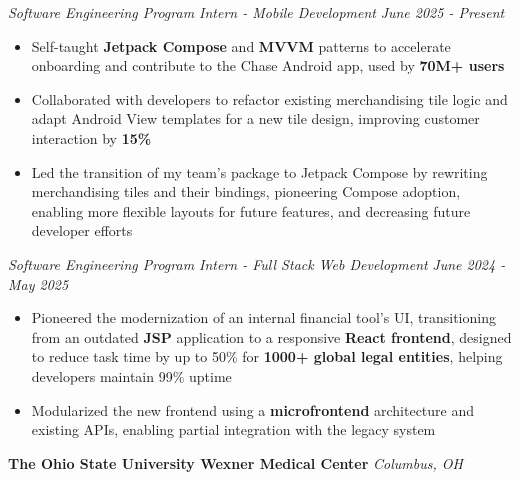 \documentclass[letterpaper]{article}
\newenvironment{tightitemize}{%
  \begin{itemize}\small\setlength{\baselineskip}{0.95\baselineskip}\itemsep -1mm%
}{\end{itemize}}
\begin{document}
    \textit{Software Engineering Program Intern - Mobile Development} \hfill \textsl{June 2025 - Present}\\
    \vspace{-7pt}
    \begin{tightitemize} \itemsep -1mm

            \item Self-taught \textbf{Jetpack Compose} and \textbf{MVVM} patterns to accelerate onboarding and contribute to the Chase Android app, used by \textbf{70M+ users}
            
            \item Collaborated with developers to refactor existing merchandising tile logic and adapt Android View templates for a new tile design, improving customer interaction by \textbf{15\%}
            
            \item Led the transition of my team’s package to Jetpack Compose by rewriting merchandising tiles and their bindings, pioneering Compose adoption, enabling more flexible layouts for future features, and decreasing future developer efforts
                    
    \end{tightitemize}
    \textit{Software Engineering Program Intern - Full Stack Web Development} \hfill \textsl{June 2024 - May 2025}\\
    \vspace{-7pt}
    \begin{tightitemize} \itemsep -1mm

            \item Pioneered the modernization of an internal financial tool’s UI, transitioning from an outdated \textbf{JSP} application to a responsive \textbf{React frontend}, designed to reduce task time by up to 50\% for \textbf{1000+ global legal entities}, helping developers maintain 99\% uptime

            \item Modularized the new frontend using a \textbf{microfrontend} architecture and existing APIs, enabling partial integration with the legacy system
                    
    \end{tightitemize}
    \vspace{-2mm}

    \textbf{The Ohio State University Wexner Medical Center} \hfill \textsl{Columbus, OH}\\
    
\end{document}
